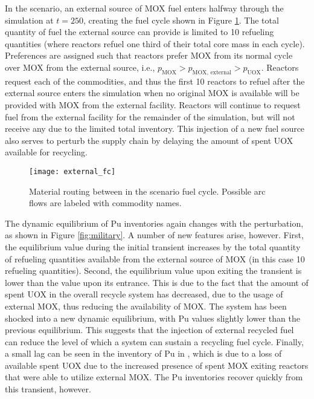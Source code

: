 In the \external scenario, an external source of MOX fuel enters halfway
through the simulation at $t = 250$, creating the fuel cycle shown in Figure
\ref{fig:military_fc}. The total quantity of fuel the external source can provide is
limited to 10 refueling quantities (where reactors refuel one third of their
total core mass in each cycle). Preferences are assigned such that reactors
prefer MOX from its normal cycle over MOX from the external source, i.e.,
$p_{\text{MOX}} > p_{\text{MOX, external}} > p_{\text{UOX}}$. Reactors request each
of the commodities, and thus the first 10 reactors to refuel after the external
source enters the simulation when no original MOX is available will be provided
with MOX from the external facility. Reactors will continue to request fuel from the
external facility for the remainder of the simulation, but will not receive any due
to the limited total inventory. This injection of a new fuel source also serves to
perturb the supply chain by delaying the amount of spent UOX available for
recycling.

\begin{figure}
  \begin{center}
    \texttt{[image: external\_fc]}
    \caption[]{
      \label{fig:military_fc}
      Material routing between in the \external scenario fuel
      cycle. Possible arc flows are labeled with commodity names.}
  \end{center}
\end{figure}

The dynamic equilibrium of Pu inventories again changes with the \external
perturbation, as shown in Figure \ref{fig:military}. A number of new features
arise, however. First, the equilibrium value during the initial transient
increases by the total quantity of refueling quantities available from the
external source of MOX (in this case 10 refueling quantities). Second, the
equilibrium value upon exiting the transient is lower than the value upon its
entrance. This is due to the fact that the amount of spent UOX in the overall
recycle system has decreased, due to the usage of external MOX, thus reducing
the availability of MOX. The system has been shocked into a new dynamic
equilibrium, with Pu values slightly lower than the previous
equilibrium. This suggests that the injection of external recycled fuel can
reduce the level of which a system can sustain a recycling fuel cycle. Finally,
a small lag can be seen in the inventory of Pu in \fabrication, which is due
to a loss of available spent UOX due to the increased presence of spent MOX
exiting reactors that were able to utilize external MOX. The Pu inventories 
recover quickly from this transient, however.

